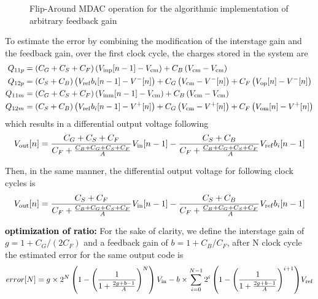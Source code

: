 \begin{figure}[htp]
\begin{subfigure}[b]{0.45\textwidth}
		\label{fig:algo-mdac-phi2}
	\end{subfigure}
	\caption{Flip-Around MDAC operation for the algorithmic implementation of arbitrary feedback gain}
	\label{fig:algo-mdac-cb}
\end{figure}

To estimate the error by combining the modification of the interstage gain and the feedback gain, over the first clock cycle, the charges stored in the system are
\begin{align}
Q_{11p} &= \left(C_G+C_S+C_F \right) \left( V_{\rm inp}[n-1] - V_{\rm cm} \right) + C_B \left(V_{\rm cm}-V_{\rm cm} \right) \\
Q_{12p} &= \left(C_S+C_B \right) \left( V_{\rm ref}b_i[n-1] - V^{-}[n] \right) + C_G \left(V_{\rm cm}-V^{-}[n] \right)  + C_F \left(V_{\rm op}[n]-V^{-}[n] \right) \\
Q_{11m} &= \left(C_G+C_S+C_F \right) \left( V_{\rm inm}[n-1] - V_{\rm cm} \right) + C_B \left(V_{\rm cm}-V_{\rm cm} \right) \\
Q_{12m} &= \left(C_S+C_B \right) \left( V_{\rm ref}b_i[n-1] - V^{+}[n] \right) + C_G \left(V_{\rm cm}-V^{+}[n] \right)  + C_F \left(V_{\rm om}[n]-V^{+}[n] \right) 
\end{align}
which results in a differential output voltage following 
\begin{equation}
	V_{\rm out}[n] = \frac{C_G+C_S+C_F}{C_F+\frac{C_B+C_G+C_S+C_F}{A}} V_{\rm in}[n-1] - \frac{C_S+C_B}{C_F+\frac{C_B+C_G+C_S+C_F}{A}} V_{\rm ref}b_i[n-1]
\end{equation}

Then, in the same manner, the differential output voltage for following clock cycles is
\begin{equation}
	V_{\rm out}[n] = \frac{C_S+C_F}{C_F+\frac{C_B+C_G+C_S+C_F}{A}} V_{\rm in}[n-1] - \frac{C_S+C_B}{C_F+\frac{C_B+C_G+C_S+C_F}{A}} V_{\rm ref}b_i[n-1]
\end{equation}

\textbf{\textcolor{black}{optimization of ratio:}}
For the sake of clarity, we define the interstage gain of \(g = 1+C_G/(2C_F)\) and a feedback gain of \(b = 1+C_B/C_F\), after N clock cycle the estimated error for the same output code is
\begin{equation}
	error[N] = g \times 2^N \left(1-{\left(\frac{1}{1+\frac{2g+b-1}{A}} \right)}^N \right) V_{\rm in} - b \times \sum_{i=0}^{N-1}{2^i\left(1-{\left(\frac{1}{1+\frac{2g+b-1}{A}} \right)}^{i+1} \right)} V_{\rm ref}
\end{equation}

